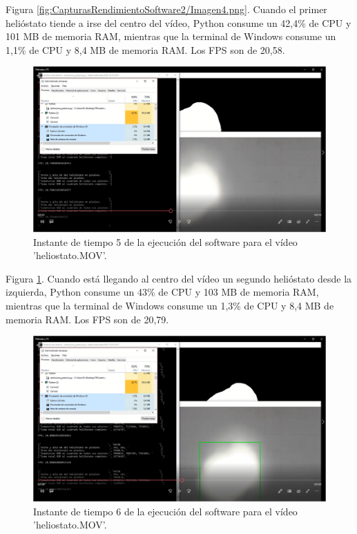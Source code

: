 Figura \ref{fig:CapturasRendimientoSoftware2/Imagen4.png}. Cuando el primer helióstato tiende a irse del centro del vídeo, Python consume un 42,4\% de CPU y 101 MB de memoria RAM, mientras que la terminal de Windows consume un 1,1\% de CPU y 8,4 MB de memoria RAM. Los FPS son de 20,58.

\begin{figure}[h!]
  	\centering
	\includegraphics[width=\textwidth]{CapturasRendimientoSoftware2/Imagen5.png}
	\caption{Instante de tiempo 5 de la ejecución del software para el vídeo 'heliostato.MOV'.
	\label{fig:CapturasRendimientoSoftware2/Imagen5.png}}
\end{figure}

Figura \ref{fig:CapturasRendimientoSoftware2/Imagen5.png}. Cuando está llegando al centro del vídeo un segundo helióstato desde la izquierda, Python consume un 43\% de CPU y 103 MB de memoria RAM, mientras que la terminal de Windows consume un 1,3\% de CPU y 8,4 MB de memoria RAM. Los FPS son de 20,79.

\begin{figure}[h!]
  	\centering
	\includegraphics[width=\textwidth]{CapturasRendimientoSoftware2/Imagen6.png}
	\caption{Instante de tiempo 6 de la ejecución del software para el vídeo 'heliostato.MOV'.
	\label{fig:CapturasRendimientoSoftware2/Imagen6.png}}
\end{figure}

